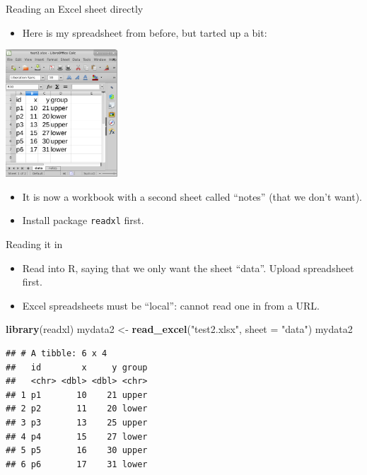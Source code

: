 \documentclass[
  ignorenonframetext,
]{beamer}
\newenvironment{Shaded}{\begin{snugshade}}{\end{snugshade}}
\newcommand{\DataTypeTok}[1]{\textcolor[rgb]{0.13,0.29,0.53}{#1}}
\newcommand{\KeywordTok}[1]{\textcolor[rgb]{0.13,0.29,0.53}{\textbf{#1}}}
\newcommand{\NormalTok}[1]{#1}
\newcommand{\StringTok}[1]{\textcolor[rgb]{0.31,0.60,0.02}{#1}}
\providecommand{\tightlist}{%
  \setlength{\itemsep}{0pt}\setlength{\parskip}{0pt}}
\begin{document}
\begin{frame}[fragile]{Reading an Excel sheet directly}
\protect\hypertarget{reading-an-excel-sheet-directly}{}

\begin{itemize}
\tightlist
\item
  Here is my spreadsheet from before, but tarted up a bit:
\end{itemize}

\includegraphics[width=\textwidth,height=1.875in]{excel.png}

\begin{itemize}
\tightlist
\item
  It is now a workbook with a second sheet called ``notes'' (that we
  don't want).
\item
  Install package \texttt{readxl} first.
\end{itemize}

\end{frame}

\begin{frame}[fragile]{Reading it in}
\protect\hypertarget{reading-it-in}{}

\begin{itemize}
\tightlist
\item
  Read into R, saying that we only want the sheet ``data''. Upload
  spreadsheet first.
\item
  Excel spreadsheets must be ``local'': cannot read one in from a URL.
\end{itemize}

\begin{Shaded}
\begin{Highlighting}[]
\KeywordTok{library}\NormalTok{(readxl)}
\NormalTok{mydata2 <-}\StringTok{ }\KeywordTok{read_excel}\NormalTok{(}\StringTok{"test2.xlsx"}\NormalTok{, }\DataTypeTok{sheet =} \StringTok{"data"}\NormalTok{)}
\NormalTok{mydata2}
\end{Highlighting}
\end{Shaded}

\begin{verbatim}
## # A tibble: 6 x 4
##   id        x     y group
##   <chr> <dbl> <dbl> <chr>
## 1 p1       10    21 upper
## 2 p2       11    20 lower
## 3 p3       13    25 upper
## 4 p4       15    27 lower
## 5 p5       16    30 upper
## 6 p6       17    31 lower
\end{verbatim}

\end{frame}
\end{document}
